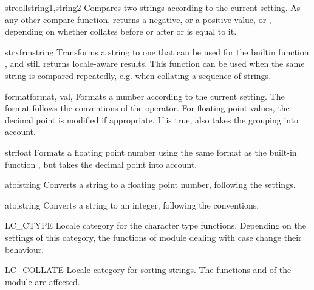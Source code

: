 \begin{funcdesc}{strcoll}{string1,string2}
Compares two strings according to the current 
setting. As any other compare function, returns a negative, or a
positive value, or , depending on whether 
collates before or after  or is equal to it.
\end{funcdesc}

\begin{funcdesc}{strxfrm}{string}
Transforms a string to one that can be used for the builtin function
, and still returns locale-aware
results.  This function can be used when the same string is compared
repeatedly, e.g. when collating a sequence of strings.
\end{funcdesc}

\begin{funcdesc}{format}{format, val, }
Formats a number  according to the current
 setting.  The format follows the conventions of
the \code{\%} operator.  For floating point values, the decimal point
is modified if appropriate.  If  is true, also takes the
grouping into account.
\end{funcdesc}

\begin{funcdesc}{str}{float}
Formats a floating point number using the same format as the built-in
function , but takes the decimal point into
account.
\end{funcdesc}

\begin{funcdesc}{atof}{string}
Converts a string to a floating point number, following the
 settings.
\end{funcdesc}

\begin{funcdesc}{atoi}{string}
Converts a string to an integer, following the 
conventions.
\end{funcdesc}

\begin{datadesc}{LC_CTYPE}
Locale category for the character type functions. Depending on the
settings of this category, the functions of module 
dealing with case change their behaviour.
\end{datadesc}

\begin{datadesc}{LC_COLLATE}
Locale category for sorting strings. The functions
 and  of the 
module are affected.
\end{datadesc}

